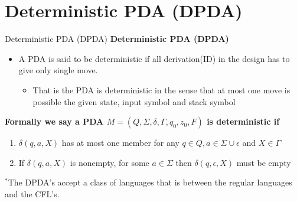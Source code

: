 \documentclass{beamer}
\begin{document}
\section{Deterministic PDA (DPDA)}
\begin{frame}{Deterministic PDA (DPDA)}
	\textbf{Deterministic PDA (DPDA)}
	\begin{itemize}
		\item A PDA is said to be deterministic if all derivation(ID) in the design has to give only single move.
		\begin{itemize}
		\item That is the PDA is deterministic in the sense that at most one move is possible the given state, input symbol and stack symbol
		\end{itemize}
	\end{itemize}
	\textbf{Formally we say a PDA $M=(Q,\Sigma,\delta,\Gamma,q_0,z_0,F)$ is deterministic if}
	\begin{enumerate}
		\item $\delta (q,a,X)$ has at most one member for any $q \in Q, a \in \Sigma \cup \epsilon $ and $X \in \Gamma$
		\item If $\delta (q,a,X)$ is nonempty, for some $a \in \Sigma$ then $\delta (q,\epsilon,X)$ must be empty
 		\end{enumerate}
 	$^*$The DPDA’s accept a class of languages that is between the regular languages and the CFL’s.
\end{frame}
\end{document}
